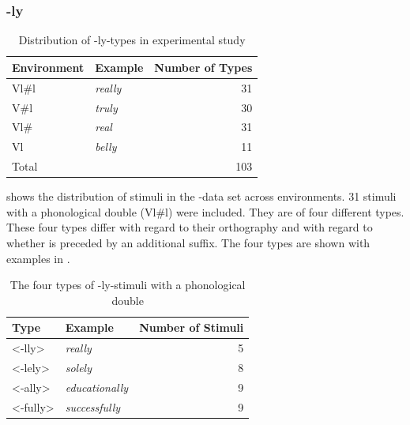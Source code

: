 \subsubsection{-ly} \label{stimuli ly}


\begin{table}[b!]
	\caption{Distribution of -ly-types in experimental study}
	\label{tbl:distribution of ly types in experiment}
	
	
		\begin{tabular} {llr}
			
			Environment & Example & Number of  Types\\
			\midrule
			Vl\#l &\color[HTML]{3166FF}\textit{really} & 31 \\ 
			V\#l &\color[HTML]{3166FF}\textit{truly} & 30 \\ 
			Vl\# &\color[HTML]{3166FF}\textit{real} & 31\\ 
			Vl &\color[HTML]{3166FF}\textit{belly} & 11\\ 
			\midrule   	
			Total&  & 103 \\ 
			\midrule   	
			
		\end{tabular}
	
\end{table}




 shows the distribution of  stimuli in the -data set across environments. 
31 stimuli with a phonological double (Vl\#l) were included. 
They are of four different types. These four types differ with regard to their orthography and with regard to whether  is preceded by an additional suffix. The four types are shown with examples in .




\begin{table}[b!]
	\caption{The four types of -ly-stimuli with a phonological double}
	\label{tbl:The four types of ly-stimuli with a phonological double}
	
	
		\begin{tabular} {llr}
			
			Type & Example & Number of  Stimuli\\
			
			\midrule
			<-lly>&\color[HTML]{3166FF}\textit{really} & 5 \\ 
			<-lely>  \phantom{hggzujg}&\color[HTML]{3166FF}\textit{solely} & 8\\ 
			<-ally>&\color[HTML]{3166FF}\textit{educationally} &9\\ 
			<-fully>&\color[HTML]{3166FF}\textit{successfully} & 9 \\ 
			\midrule   	
			
			
		\end{tabular}
	
\end{table}


